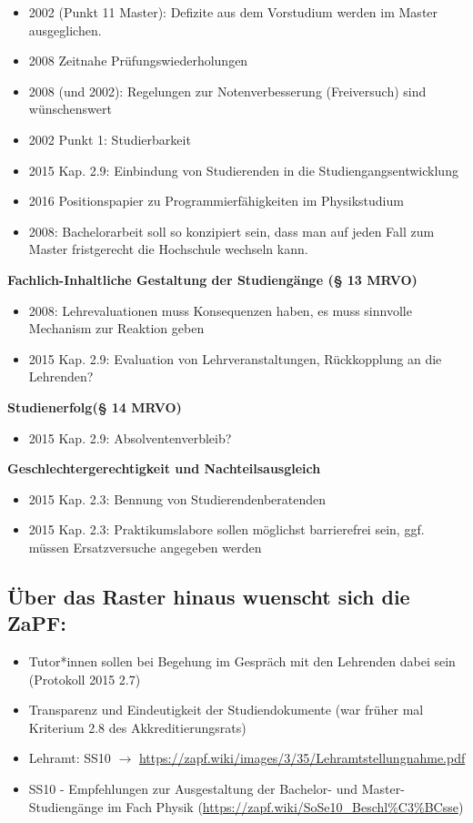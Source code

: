 \begin{itemize}
        \item 2002 (Punkt 11 Master): Defizite aus dem Vorstudium werden im Master ausgeglichen.
        \item 2008 Zeitnahe Prüfungswiederholungen
        \item 2008 (und 2002): Regelungen zur Notenverbesserung (Freiversuch) sind wünschenswert
        \item 2002 Punkt 1: Studierbarkeit
        \item 2015 Kap. 2.9: Einbindung von Studierenden in die Studiengangsentwicklung
        \item 2016 Positionspapier zu Programmierfähigkeiten im Physikstudium
        \item 2008: Bachelorarbeit soll so konzipiert sein, dass man auf jeden Fall zum Master fristgerecht die Hochschule wechseln kann.
      \end{itemize}


    \textbf{Fachlich-Inhaltliche Gestaltung der Studiengänge (§ 13 MRVO)}
      \begin{itemize}
        \item 2008: Lehrevaluationen muss Konsequenzen haben, es muss sinnvolle Mechanism zur Reaktion geben
        \item 2015 Kap. 2.9: Evaluation von Lehrveranstaltungen, Rückkopplung an die Lehrenden?
      \end{itemize}

    \textbf{Studienerfolg(§ 14 MRVO)}
      \begin{itemize}
        \item 2015 Kap. 2.9: Absolventenverbleib?
      \end{itemize}

    \textbf{Geschlechtergerechtigkeit und Nachteilsausgleich}
      \begin{itemize}
        \item 2015 Kap. 2.3: Bennung von Studierendenberatenden
        \item 2015 Kap. 2.3: Praktikumslabore sollen möglichst barrierefrei sein, ggf. müssen Ersatzversuche angegeben werden
      \end{itemize}

    \subsection{Über das Raster hinaus wuenscht sich die ZaPF:}
      \begin{itemize}
        \item Tutor*innen sollen bei Begehung im Gespräch mit den Lehrenden dabei sein (Protokoll 2015 2.7)
        \item Transparenz und Eindeutigkeit der Studiendokumente (war früher mal Kriterium 2.8 des Akkreditierungsrats)
        \item Lehramt: SS10 $\rightarrow$ \url{https://zapf.wiki/images/3/35/Lehramtstellungnahme.pdf}
        \item SS10 - Empfehlungen zur Ausgestaltung der Bachelor- und Master-Studiengänge im Fach Physik (\url{https://zapf.wiki/SoSe10_Beschl%C3%BCsse})
      \end{itemize}

